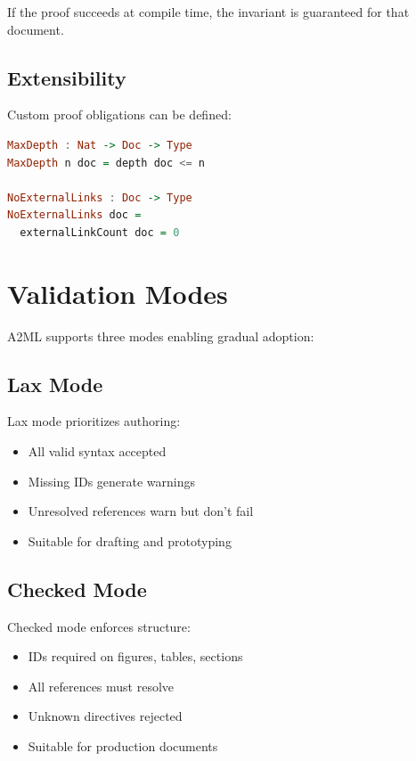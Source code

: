 \documentclass[10pt,twocolumn]{article}
\begin{document}
\noindent If the proof succeeds at compile time, the invariant is guaranteed for that document.

\subsection{Extensibility}

Custom proof obligations can be defined:

\begin{lstlisting}[language=Haskell]
MaxDepth : Nat -> Doc -> Type
MaxDepth n doc = depth doc <= n

NoExternalLinks : Doc -> Type
NoExternalLinks doc =
  externalLinkCount doc = 0
\end{lstlisting}

\section{Validation Modes}
\label{sec:modes}

A2ML supports three modes enabling gradual adoption:

\subsection{Lax Mode}

Lax mode prioritizes authoring:
\begin{itemize}
  \item All valid syntax accepted
  \item Missing IDs generate warnings
  \item Unresolved references warn but don't fail
  \item Suitable for drafting and prototyping
\end{itemize}

\subsection{Checked Mode}

Checked mode enforces structure:
\begin{itemize}
  \item IDs required on figures, tables, sections
  \item All references must resolve
  \item Unknown directives rejected
  \item Suitable for production documents
\end{itemize}
\end{document}
